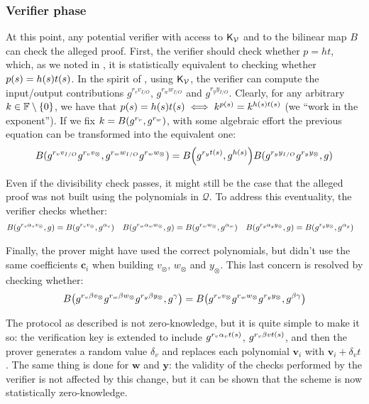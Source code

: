 \subsubsection*{Verifier phase}
At this point, any potential verifier with access to \(\mathsf{K}_\mathcal{V} \) and to the bilinear map 
\(B\) can check the alleged proof.
First, the verifier should check whether \(p = ht\), which, as we noted in , it is 
statistically equivalent to checking whether \(\call{p}{s} = \call{h}{s}\call{t}{s}\).
In the spirit of , using \(\mathsf{K}_\mathcal{V} \), the verifier can compute the 
input/output contributions \(g^{r_{v}v_{I/O}}\), \(g^{r_{w}w_{I/O}}\) and \(g^{r_{y}y_{I/O}}\).
Clearly, for any arbitrary \(k \in \mathbb{F} \setminus \left\{0\right\}\), we have that 
\(\call{p}{s} = \call{h}{s}\call{t}{s} \iff k^{\call{p}{s}} = k^{\call{h}{s}\call{t}{s}}\) (we 
``work in the exponent'').
If we fix \(k = \call{B}{g^{r_v}, g^{r_w}}\), with some algebraic effort the previous 
equation can be transformed into the equivalent one:
\[
  \call{B}{g^{r_{v}v_{I/O}}g^{r_{v}v_{\otimes}}, g^{r_{w}w_{I/O}}g^{r_{w}w_{\otimes}}} =
  \call{B}{g^{r_{y}\call{t}{s}}, g^{\call{h}{s}}}\call{B}{g^{r_{y}y_{I/O}}g^{r_{y}y_{\otimes}}, g}
\]

Even if the divisibility check passes, it might still be the case that the alleged 
proof was not built using the polynomials in \(\mathcal{Q}\).
To address this eventuality, the verifier checks whether:
\begin{align*}
  &  \call{B}{g^{r_{v}\alpha_{v}v_{\otimes}}, g} = \call{B}{g^{r_{v}v_{\otimes}}, g^{\alpha_v}}
  && \call{B}{g^{r_{w}\alpha_{w}w_{\otimes}}, g} = \call{B}{g^{r_{w}w_{\otimes}}, g^{\alpha_w}}
  && \call{B}{g^{r_{y}\alpha_{y}y_{\otimes}}, g} = \call{B}{g^{r_{y}y_{\otimes}}, g^{\alpha_y}}
\end{align*}

Finally, the prover might have used the correct polynomials, but didn't use the same 
coefficients \(\bm{c}_i\) when building \(v_{\otimes}\), \(w_{\otimes}\) and \(y_{\otimes}\).
This last concern is resolved by checking whether:
\[
  \call{B}{g^{r_{v}{\beta}v_{\otimes}}g^{r_{w}{\beta}w_{\otimes}}g^{r_{y}{\beta}y_{\otimes}}, g^{\gamma}} =
  \call{B}{g^{r_{v}v_{\otimes}}g^{r_{w}w_{\otimes}}g^{r_{y}y_{\otimes}}, g^{\beta\gamma}}
\]

The protocol as described is not zero-knowledge, but it is quite simple to make it so:
the verification key is extended to include \(g^{r_{v}\alpha_{v}t\left(s\right)}\), 
\(g^{r_{v}\beta{v}t\left(s\right)}\), and then the prover generates a random value \(\delta_v\) and 
replaces each polynomial \(\bm{v}_i\) with \(\bm{v}_i + \delta_{v}t\). 
The same thing is done for \(\bm{w}\) and \(\bm{y}\): the validity of the checks performed by the 
verifier is not affected by this change, but it can be shown that the scheme is now 
statistically zero-knowledge.

